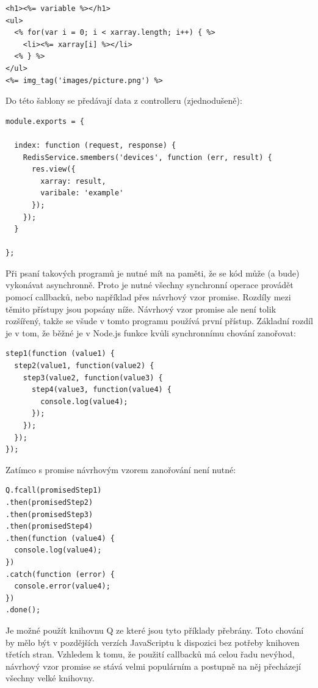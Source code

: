 \begin{verbatim}
<h1><%= variable %></h1>
<ul>
  <% for(var i = 0; i < xarray.length; i++) { %>
    <li><%= xarray[i] %></li>
  <% } %>
</ul>
<%= img_tag('images/picture.png') %>
\end{verbatim}

Do této šablony se předávají data z controlleru (zjednodušeně):

\begin{verbatim}
module.exports = {

  index: function (request, response) {
    RedisService.smembers('devices', function (err, result) {
      res.view({
        xarray: result,
        varibale: 'example'
      });
    });
  }

};
\end{verbatim}

Při psaní takových programů je nutné mít na paměti, že se kód může (a bude) vykonávat asynchronně. Proto je nutné všechny synchronní operace provádět pomocí callbacků, nebo například přes návrhový vzor promise.  Rozdíly mezi těmito přístupy jsou popsány níže. Návrhový vzor promise ale není tolik rozšířený, takže se všude v tomto programu používá první přístup. Základní rozdíl je v tom, že běžné je v Node.js funkce kvůli synchronnímu chování zanořovat:

\begin{verbatim}
step1(function (value1) {
  step2(value1, function(value2) {
    step3(value2, function(value3) {
      step4(value3, function(value4) {
        console.log(value4);
      });
    });
  });
});
\end{verbatim}

Zatímco s promise návrhovým vzorem zanořování není nutné:

\begin{verbatim}
Q.fcall(promisedStep1)
.then(promisedStep2)
.then(promisedStep3)
.then(promisedStep4)
.then(function (value4) {
  console.log(value4);
})
.catch(function (error) {
  console.error(value4);
})
.done();
\end{verbatim}

Je možné použít knihovnu Q \cite{q} ze které jsou tyto příklady přebrány. Toto chování by mělo být v pozdějších verzích JavaScriptu k dispozici bez potřeby knihoven třetích stran. Vzhledem k tomu, že použití callbacků má celou řadu nevýhod, návrhový vzor promise se stává velmi populárním a postupně na něj přecházejí všechny velké knihovny.

